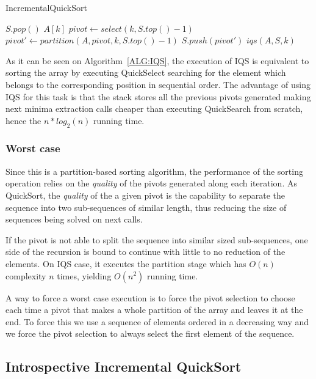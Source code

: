 \begin{algorithm}
  \caption{IncrementalQuickSort}\label{ALG:IQS}
  \begin{algorithmic}[1]
    \State $S.pop()$
    \Return $A[k]$
    \EndIf
    \State $pivot \gets select(k, S.top()-1)$
    \State $pivot' \gets partition(A,pivot,k, S.top()-1)$
    \State $S.push(pivot')$
    \State \Return $iqs(A,S,k)$
    \EndProcedure
  \end{algorithmic}
\end{algorithm}

As it can be seen on Algorithm~\ref{ALG:IQS}, the execution of IQS is equivalent to sorting the array by executing QuickSelect searching for the element which belongs to the corresponding position in sequential order. The advantage of using IQS for this task is that the stack stores all the previous pivots generated making next minima extraction calls cheaper than executing QuickSearch from scratch, hence the $n*log_2(n)$ running time.

\subsubsection{Worst case}
Since this is a partition-based sorting algorithm, the performance of the sorting operation relies on the \textit{quality} of the pivots generated along each iteration. As QuickSort, the \textit{quality} of the a given pivot is the capability to separate the sequence into two sub-sequences of similar length, thus reducing the size of sequences being solved on next calls.

If the pivot is not able to split the sequence into similar sized sub-sequences, one side of the recursion is bound to continue with little to no reduction of the elements. On IQS case, it executes the partition stage which has $O(n)$ complexity $n$ times, yielding $O(n^2)$ running time.

A way to force a worst case execution is to force the pivot selection to choose each time a pivot that makes a whole partition of the array and leaves it at the end. To force this we use a sequence of elements ordered in a decreasing way and we force the pivot selection to always select the first element of the sequence.

\subsection{Introspective Incremental QuickSort}

